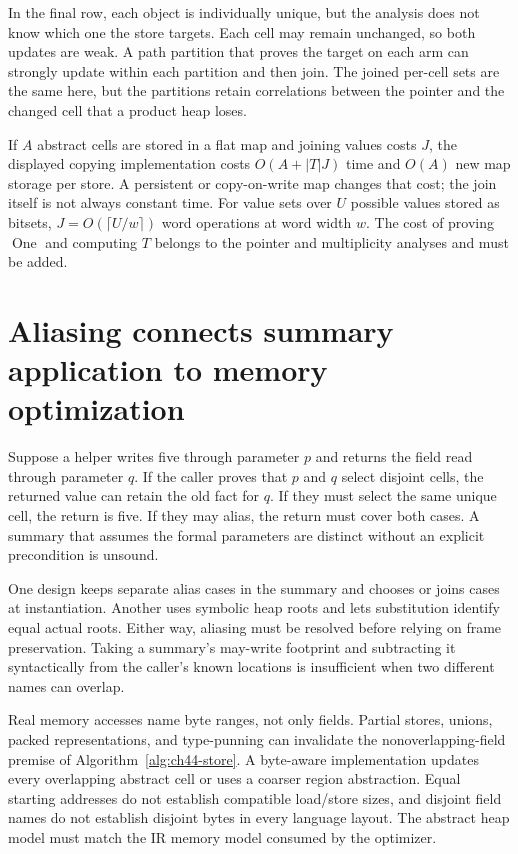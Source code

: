 In the final row, each object is individually unique, but the analysis does not know which one the store targets.
Each cell may remain unchanged, so both updates are weak.
A path partition that proves the target on each arm can strongly update within each partition and then join.
The joined per-cell sets are the same here, but the partitions retain correlations between the pointer and the changed cell that a product heap loses.

If $A$ abstract cells are stored in a flat map and joining values costs $J$, the displayed copying implementation costs $O(A+|T|J)$ time and $O(A)$ new map storage per store.
A persistent or copy-on-write map changes that cost; the join itself is not always constant time.
For value sets over $U$ possible values stored as bitsets, $J=O(\lceil U/w\rceil)$ word operations at word width $w$.
The cost of proving $\operatorname{One}$ and computing $T$ belongs to the pointer and multiplicity analyses and must be added.

\section{Aliasing connects summary application to memory optimization}
\label{sec:ch44-alias-summary}

Suppose a helper writes five through parameter $p$ and returns the field read through parameter $q$.
If the caller proves that $p$ and $q$ select disjoint cells, the returned value can retain the old fact for $q$.
If they must select the same unique cell, the return is five.
If they may alias, the return must cover both cases.
A summary that assumes the formal parameters are distinct without an explicit precondition is unsound.

One design keeps separate alias cases in the summary and chooses or joins cases at instantiation.
Another uses symbolic heap roots and lets substitution identify equal actual roots.
Either way, aliasing must be resolved before relying on frame preservation.
Taking a summary's may-write footprint and subtracting it syntactically from the caller's known locations is insufficient when two different names can overlap.

Real memory accesses name byte ranges, not only fields.
Partial stores, unions, packed representations, and type-punning can invalidate the nonoverlapping-field premise of Algorithm~\ref{alg:ch44-store}.
A byte-aware implementation updates every overlapping abstract cell or uses a coarser region abstraction.
Equal starting addresses do not establish compatible load/store sizes, and disjoint field names do not establish disjoint bytes in every language layout.
The abstract heap model must match the IR memory model consumed by the optimizer.

